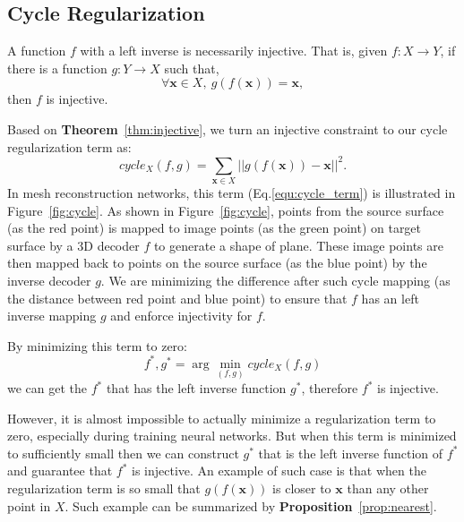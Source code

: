 \subsection{Cycle Regularization}
\label{subsec:cyclereg}
\label{subsec:inj}
\begin{m_thm}
\label{thm:injective}
A function $f$ with a left inverse is necessarily injective. That is, given $f:X \rightarrow Y$, if there is a function $g:Y \rightarrow X$ such that,
\begin{equation}
\label{equ:injective}
\forall \mathbf{x} \in X,~g(f(\mathbf{x})) = \mathbf{x},
\end{equation}
then $f$ is injective.
\end{m_thm}

Based on \textbf{Theorem}~\ref{thm:injective}, we turn an injective constraint to our cycle regularization term as:
\begin{equation}
\label{equ:cycle_term}
cycle_X(f,g)=\sum_{\mathbf{x}\in X}||g(f(\mathbf{x})) - \mathbf{x}||^2.
\end{equation}
In mesh reconstruction networks, this term (Eq.\ref{equ:cycle_term}) is illustrated in Figure~\ref{fig:cycle}. As shown in Figure~\ref{fig:cycle}, points from the source surface (as the red point) is mapped to image points (as the green point) on target surface by a 3D decoder $f$ to generate a shape of plane. These image points are then mapped back to points on the source surface (as the blue point) by the inverse decoder $g$. We are minimizing the difference after such cycle mapping (as the distance between red point and blue point) to ensure that $f$ has an left inverse mapping $g$ and enforce injectivity for $f$. 

By minimizing this term to zero:
\begin{equation}
f^*,g^* = \arg\min_{(f,g)} cycle_X(f,g)
\end{equation}
we can get the $f^*$ that has the left inverse function $g^*$, therefore $f^*$ is injective. 

However, it is almost impossible to actually minimize a regularization term to zero, especially during training neural networks. But when this term is minimized to sufficiently small then we can construct $g^*$ that is the left inverse function of $f^*$ and guarantee that $f^*$ is injective. An example of such case is that when the regularization term is so small that $g(f(\mathbf{x}))$ is closer to $\mathbf{x}$ than any other point in $X$. Such example can be summarized by \textbf{Proposition}~\ref{prop:nearest}.

